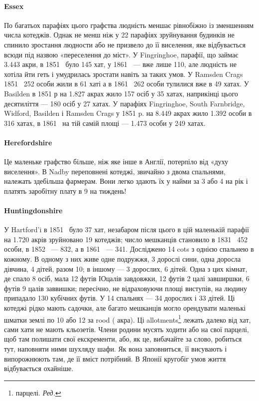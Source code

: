 \paragraph{Essex}

По багатьох парафіях цього графства людність меншає рівнобіжно
із зменшенням числа котеджів. Однак не менш ніж у
22 парафіях зруйнування будинків не спинило зростання людности
або не призвело до її виселення, яке відбувається всюди під
назвою «переселення до міст». У Fingringhoe, парафії, що займає
\num{3.443} акри, в 1851~ було 145 хат, у 1861~ — вже лише 110, але
людність не хотіла йти геть і умудрилась зростати навіть за
таких умов. У Ramsden Crags 1851~ 252 особи жили в 61 хаті
а в 1861~ 262 особи тулилися вже в 49 хатах. У Basilden в 1851 р
на \num{1.827} акрах жило 157 осіб у 35 хатах, наприкінці цього десятиліття
— 180 осіб у 27 хатах. У парафіях Fingringhoe, South
Farnbridge, Widford, Basilden і Ramsden Crags у 1851 p. на
\num{8.449} акрах жило \num{1.392} особи в 316 хатах, в 1861~ на тій самій
площі — \num{1.473} особи у 249 хатах.

\paragraph{Herefordshire}

Це маленьке графство більше, ніж яке інше в Англії, потерпіло
від «духу виселення». В Nadby переповнені котеджі,
звичайно з двома спальнями, належать здебільша фармерам.
Вони легко здають їх у найми за 3 або 4 на рік
і платять заробітну плату в 9 на тиждень!

\paragraph{Huntingdonshire}

У Hartford’i в 1851~ було 37 хат, незабаром після цього
в цій маленькій парафії на \num{1.720} акрів зруйновано 19 котеджів;
число мешканців становило в 1831~ 452 особи, в 1852~ — 832,
а в 1861~ — 341. Досліджено 14 cots з однією спальнею в кожному.
В одному з них живе одне подружжя, 3 дорослі сини, одна
доросла дівчина, 4 дітей, разом 10; в іншому — 3 дорослих,
6 дітей. Одна з цих кімнат, де спало 8 осіб, мала 12 футів ІОцалів
завдовжки, 12 футів 2 цалі завширшки, 6 футів 9 цалів заввишки;
пересічно, не відраховуючи площі виступів, на людину припадало
130 кубічних футів. У 14 спальнях — 34 дорослих і 33 дітей. Ці
котеджі рідко мають садочки, але багато мешканців могло орендувати
маленькі шматки землі по 10 або 12 за rood ( акра).
Ці allotments\footnote*{
парцелі. \emph{Ред.}
} лежать далеко від хат, сами хати не мають кльозетів.
Члени родини мусять ходити або на свої парцелі, щоб там
полишати свої екскременти, або, як це, вибачайте за слово, робиться
тут, наповняти ними шухляду шафи. Як вона заповниться,
її висувають і випорожнюють там, де її вміст потрібний. В Японії
кругобіг умов життя відбувається охайніше.

